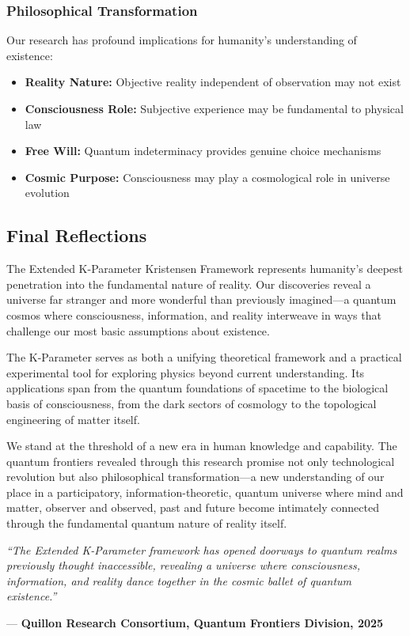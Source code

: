 \documentclass[11pt,a4paper,twoside]{article}
\begin{document}
\subsubsection{Philosophical Transformation}

Our research has profound implications for humanity's understanding of existence:

\begin{itemize}[leftmargin=*]
    \item \textbf{Reality Nature:} Objective reality independent of observation may not exist
    \item \textbf{Consciousness Role:} Subjective experience may be fundamental to physical law
    \item \textbf{Free Will:} Quantum indeterminacy provides genuine choice mechanisms
    \item \textbf{Cosmic Purpose:} Consciousness may play a cosmological role in universe evolution
\end{itemize}

\subsection{Final Reflections}

The Extended K-Parameter Kristensen Framework represents humanity's deepest penetration into the fundamental nature of reality. Our discoveries reveal a universe far stranger and more wonderful than previously imagined---a quantum cosmos where consciousness, information, and reality interweave in ways that challenge our most basic assumptions about existence.

The K-Parameter serves as both a unifying theoretical framework and a practical experimental tool for exploring physics beyond current understanding. Its applications span from the quantum foundations of spacetime to the biological basis of consciousness, from the dark sectors of cosmology to the topological engineering of matter itself.

We stand at the threshold of a new era in human knowledge and capability. The quantum frontiers revealed through this research promise not only technological revolution but also philosophical transformation---a new understanding of our place in a participatory, information-theoretic, quantum universe where mind and matter, observer and observed, past and future become intimately connected through the fundamental quantum nature of reality itself.

\begin{center}
\vspace{0.5cm}
\textit{``The Extended K-Parameter framework has opened doorways to quantum realms previously thought inaccessible, revealing a universe where consciousness, information, and reality dance together in the cosmic ballet of quantum existence.''}

\vspace{0.3cm}
--- \textbf{Quillon Research Consortium, Quantum Frontiers Division, 2025}
\end{center}
\end{document}
